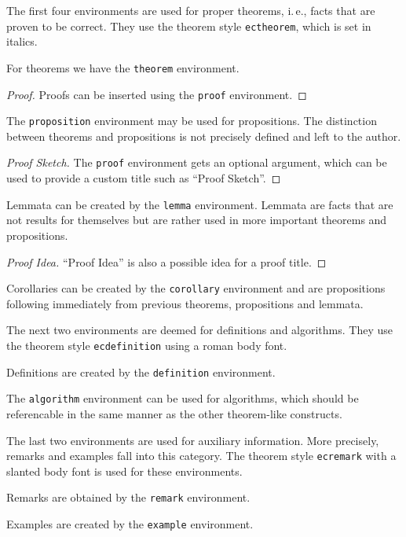 \documentclass{eceasst}
\begin{document}
The first four environments are used for proper theorems, i.\,e., facts that
are proven to be correct.
They use the theorem style \verb|ectheorem|, which is set in italics.
\begin{theorem}\label{the}
For theorems we have the \verb|theorem| environment.
\end{theorem}
\begin{proof}
Proofs can be inserted using the \verb|proof| environment.
\end{proof}
\begin{proposition}\label{prop}
The \verb|proposition| environment may be used for propositions.
The distinction between theorems and propositions is not precisely defined and
left to the author.
\end{proposition}
\begin{proof}[Proof Sketch]
The \verb|proof| environment gets an optional argument, which can be used
to provide a custom title such as ``Proof Sketch''.
\end{proof}
\begin{lemma}\label{lem}
Lemmata can be created by the \verb|lemma| environment.
Lemmata are facts that are not results for themselves but are rather used in
more important theorems and propositions.
\end{lemma}
\begin{proof}[Proof Idea]
``Proof Idea'' is also a possible idea for a proof title.
\end{proof}
\begin{corollary}\label{cor}
Corollaries can be created by the \verb|corollary| environment and are
propositions following immediately from previous theorems, propositions and
lemmata.
\end{corollary}

The next two environments are deemed for definitions and algorithms.
They use the theorem style \verb|ecdefinition| using a roman body font.
\begin{definition}\label{def}
Definitions are created by the \verb|definition| environment.
\end{definition}
\begin{algorithm}\label{alg}
The \verb|algorithm| environment can be used for algorithms, which should be
referencable in the same manner as the other theorem-like constructs.
\end{algorithm}

The last two environments are used for auxiliary information.
More precisely, remarks and examples fall into this category.
The theorem style \verb|ecremark| with a slanted body font is used for these
environments.
\begin{remark}\label{rem}
Remarks are obtained by the \verb|remark| environment.
\end{remark}
\begin{example}[An example]\label{ex}
Examples are created by the \verb|example| environment.
\end{example}
\end{document}
